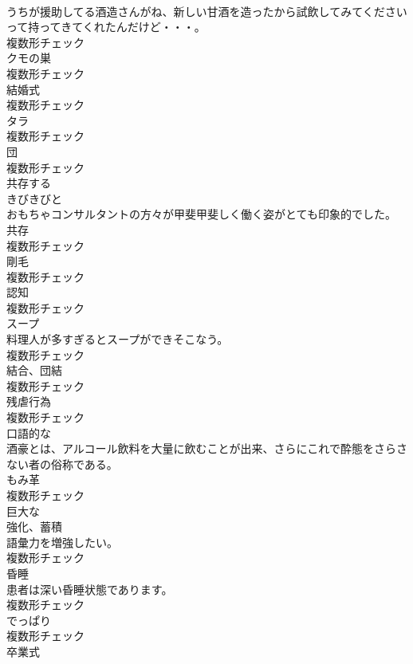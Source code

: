 \documentclass[8pt]{extreport}
\begin{document}
\begin{CJK}{UTF8}{min}
\\	うちが援助してる酒造さんがね、新しい甘酒を造ったから試飲してみてくださいって持ってきてくれたんだけど・・・。	
\\	複数形チェック
\\	[名詞]	クモの巣	
\\	複数形チェック
\\	[名詞]	結婚式	
\\	複数形チェック
\\	[名詞]	タラ	
\\	複数形チェック
\\	[名詞]	団	
\\	複数形チェック
\\	[動詞]	共存する	
\\	[副詞]	きびきびと	
\\	おもちゃコンサルタントの方々が甲斐甲斐しく働く姿がとても印象的でした。	
\\	[名詞]	共存	
\\	複数形チェック
\\	[名詞]	剛毛	
\\	複数形チェック
\\	[名詞]	認知	
\\	複数形チェック
\\	[名詞]	スープ	
\\	料理人が多すぎるとスープができそこなう。	
\\	複数形チェック
\\	[名詞]	結合、団結	
\\	複数形チェック
\\	[名詞]	残虐行為	
\\	複数形チェック
\\	[形容詞]	口語的な	
\\	酒豪とは、アルコール飲料を大量に飲むことが出来、さらにこれで酔態をさらさない者の俗称である。	
\\	[名詞]	もみ革	
\\	複数形チェック
\\	[形容詞]	巨大な	
\\	[名詞]	強化、蓄積	
\\	語彙力を増強したい。	
\\	複数形チェック
\\	[名詞]	昏睡	
\\	患者は深い昏睡状態であります。	
\\	複数形チェック
\\	[名詞]	でっぱり	
\\	複数形チェック
\\	[名詞]	卒業式	

\end{CJK}
\end{document}
